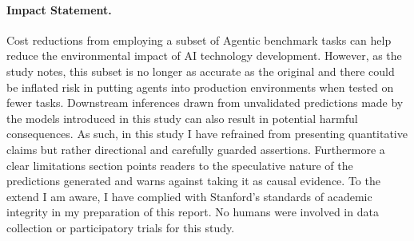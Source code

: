 \documentclass{article}
\begin{document}
\paragraph{Impact Statement.} Cost reductions from employing a subset of Agentic benchmark tasks can help reduce the environmental impact of AI technology development. However, as the study notes, this subset is no longer as accurate as the original and there could be inflated risk in putting agents into production environments when tested on fewer tasks. Downstream inferences drawn from unvalidated predictions made by the models introduced in this study can also result in potential harmful consequences. As such, in this study I have refrained from presenting quantitative claims but rather directional and carefully guarded assertions. Furthermore a clear limitations section points readers to the speculative nature of the predictions generated and warns against taking it as causal evidence. To the extend I am aware, I have complied with Stanford's standards of academic integrity in my preparation of this report. No humans were involved in data collection or participatory trials for this study.




\appendix




\end{document}
